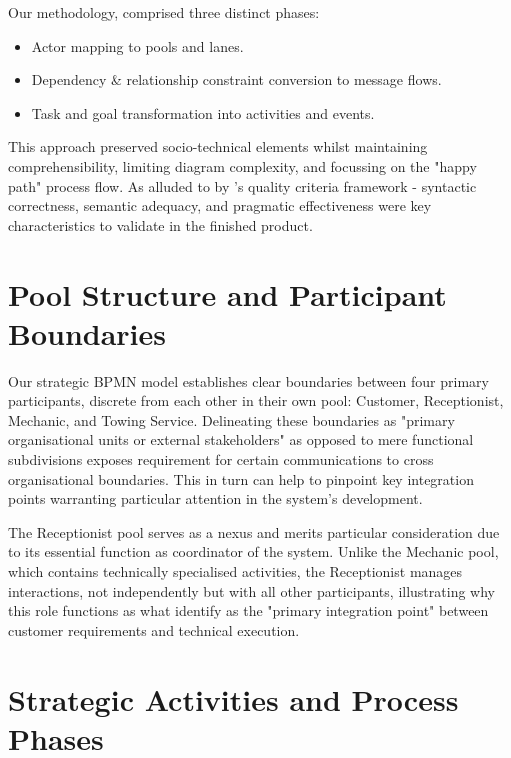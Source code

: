 \documentclass[14pt,a4paper]{article}
\begin{document}
\vspace{0.7em}
Our methodology, comprised three distinct phases:

\begin{itemize}
  \item Actor mapping to pools and lanes.
  \item Dependency \& relationship constraint conversion to message flows.
  \item Task and goal transformation into activities and events.
\end{itemize}

This approach preserved socio-technical elements whilst maintaining comprehensibility, limiting diagram complexity, and focussing on the "happy path" process flow. As alluded to by \textit{\parencite[p. 136]{Corradini2018}}'s quality criteria framework - syntactic correctness, semantic adequacy, and pragmatic effectiveness were key characteristics to validate in the finished product.

\section{Pool Structure and Participant Boundaries}

Our strategic BPMN model establishes clear boundaries between four primary participants, discrete from each other in their own pool: Customer, Receptionist, Mechanic, and Towing Service. Delineating these boundaries as "primary organisational units or external stakeholders" \textit{\parencite[p. 103]{Kluza2017}} as opposed to mere functional subdivisions exposes requirement for certain communications to cross organisational boundaries. This in turn can help to pinpoint key integration points warranting particular attention in the system's development.

The Receptionist pool serves as a nexus and merits particular consideration due to its essential function as coordinator of the system. Unlike the Mechanic pool, which contains technically specialised activities, the Receptionist manages interactions, not independently but with all other participants, illustrating why this role functions as what \textit{\parencite[p. 48]{Gorton2017}} identify as the "primary integration point" between customer requirements and technical execution.

\section{Strategic Activities and Process Phases}
\end{document}
